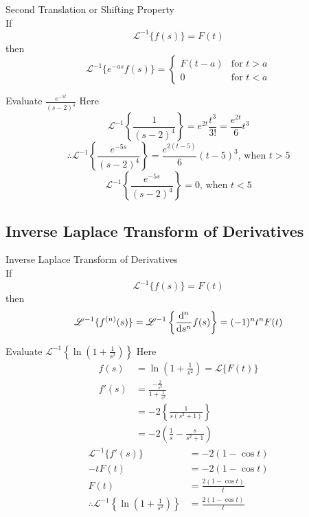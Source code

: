 \documentclass[12pt]{article}
\newcommand{\Lap}{\mathscr{L}}
\newcommand{\Lapinv}{\mathscr{L}^{-1}}
\begin{document}
\begin{theorem}{Second Translation or Shifting Property}{}
    \\If \[
        \Lapinv \{ f(s) \} = F(t)
    \] then \[
        \Lapinv \{ e^{-as}f(s) \} = 
        \begin{cases}
            F(t-a) & \text{for } t > a \\
            0 & \text{for } t < a
        \end{cases}
    \]
\end{theorem}

\begin{example}{Evaluate $\displaystyle \frac{e^{-5t}}{(s-2)^4}$}{}
    Here \[
        \Lapinv \left\{ \frac{1}{(s-2)^4} \right\} = e^{2t}\frac{t^3}{3!} = \frac{e^{2t}}{6} t^3
    \] \[
        \therefore \Lapinv \left\{ \frac{e^{-5s}}{(s-2)^4} \right\} = \frac{e^{2(t-5)}}{6} (t-5)^3 \text{, when } t > 5
    \] \[
        \Lapinv \left\{ \frac{e^{-5s}}{(s-2)^4} \right\} = 0 \text{, when } t < 5
    \]
\end{example}


\subsection{Inverse Laplace Transform of Derivatives}

\begin{theorem}{Inverse Laplace Transform of Derivatives}{}
    \\If \[
        \Lapinv \{ f(s) \} = F(t)
    \] then \[
        \Lapinv \{ f^{(n)}(s) \} = \Lapinv \left\{ \dv[n]{s} f(s) \right\} = (-1)^n t^n F(t)
    \]
\end{theorem}

\begin{example}{Evaluate $\displaystyle \Lapinv \left\{ \ln{\left( 1+\frac{1}{s^2} \right) } \right\}$}{}
    Here
    \begin{align*}
        f(s) &= \ln{\left( 1 + \frac{1}{s^2} \right) } = \Lap \{ F(t) \} \\
        f'(s) &= \frac{-\frac{2}{s^3}}{1+\frac{1}{s^2}} \\
        &= -2 \left\{ \frac{1}{s(s^2+1)} \right\} \\
        &= -2 \left( \frac{1}{s} - \frac{s}{s^2+1} \right)
    \end{align*}
    \begin{align*}
        \Lapinv \{ f'(s) \} &= -2 (1-\cos{t}) \\
        -t F(t) &= -2 (1-\cos{t}) \\
        F(t) &= \frac{2(1-\cos{t})}{t} \\
        \therefore \Lapinv \left\{ \ln{\left( 1 + \frac{1}{s^2} \right)} \right\} &= \frac{2(1-\cos{t})}{t}
    \end{align*}
\end{example}
\end{document}
